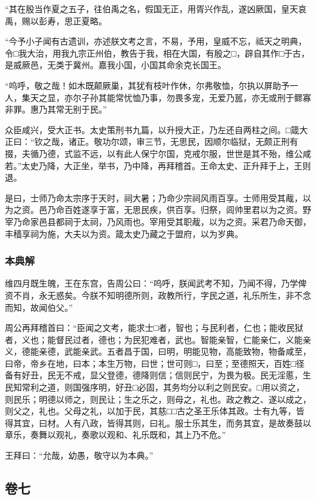 \documentclass[]{article}
\begin{document}
``其在殷当作夏之五子，往伯禹之名，假国无正，用胥兴作乱，遂凶厥国，皇天哀禹，赐以彭寿，思正夏略。

``今予小子闻有古遗训，亦述朕文考之言，不易，予用，皇威不忘，祗天之明典，令□我大治，用我九宗正州伯，教告于我，相在大国，有殷之□，辟自其作□于古，是威厥邑，无类于冀州。嘉我小国，小国其命余克长国王。

``呜呼，敬之哉！如木既颠厥巢，其犹有枝叶作休，尔弗敬恤，尔执以屏助予一人，集天之显，亦尔子孙其能常忧恤乃事，勿畏多宠，无爱乃嚚，亦无或刑于鳏寡非罪。惠乃其常无别于民。''

众臣咸兴，受大正书。太史策刑书九篇，以升授大正，乃左还自两柱之间。□箴大正曰：``钦之哉，诸正。敬功尔颂，审三节，无思民，因顺尔临狱，无颇正刑有掇，夫循乃德，式监不远，以有此人保宁尔国，克戒尔服，世世是其不殆，维公咸若。''太史乃降，大正坐，举书，乃中降，再拜稽首。王命太史、正升拜于上，王则退。

是曰，士师乃命太宗序于天时，祠大暑；乃命少宗祠风雨百享。士师用受其胾，以为之资。邑乃命百姓遂享于富，无思民疾，供百享。归祭，闾帅里君以为之资。野宰乃命家邑县都祠于太祠，乃风雨也。宰用受其职胾，以为之资。采君乃命天御，丰穑享祠为施，大夫以为资。箴太史乃藏之于盟府，以为岁典。

\hypertarget{header-n299}{%
\subsubsection{本典解}\label{header-n299}}

维四月既生魄，王在东宫，告周公曰：``呜呼，朕闻武考不知，乃闻不得，乃学俾资不肖，永无惑矣。今朕不知明德所则，政教所行，字民之道，礼乐所生，非不念而知，故闻伯父。''

周公再拜稽首曰：``臣闻之文考，能求士□者，智也；与民利者，仁也；能收民狱者，义也；能督民过者，德也；为民犯难者，武也。智能亲智，仁能亲仁，义能亲义，德能亲德，武能亲武。五者昌于国，曰明，明能见物，高能致物，物备咸至，曰帝，帝乡在地，曰本；本生万物，曰世；世可则□，曰至；至德照天，百姓□径备有好丑，民无不戒，显父登德，德降则信；信则民宁，为畏为极。民无淫慝，生民知常利之道，则国强序明，好丑□必固，其务均分以利之则民安。□用以资之，则民乐；明德以师之，则民让；生之乐之，则母之，礼也。政之教之、遂以成之，则父之，礼也。父母之礼，以加于民，其慈□□古之圣王乐体其政。士有九等，皆得其宜，曰材。人有八政，皆得其则，曰礼。服士乐其生，而务其宜，是故奏鼓以章乐，奏舞以观礼，奏歌以观和、礼乐既和，其上乃不危。''

王拜曰：``允哉，幼愚，敬守以为本典。''

\hypertarget{header-n307}{%
\subsection{卷七}\label{header-n307}}
\end{document}
